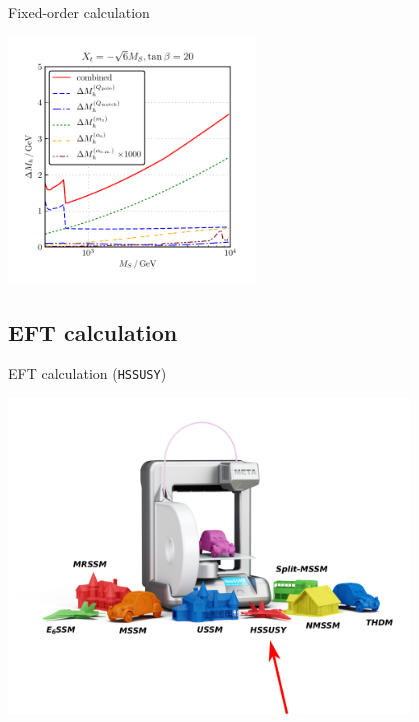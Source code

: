 \documentclass[hyperref={pdfpagelabels=false},ngerman]{beamer}
\begin{document}
\begin{frame}{Fixed-order calculation}
  \begin{center}
    \includegraphics[width=0.49\textwidth]{plots/kuts-9/SS_TB-20_Xt--sqrt6_individual}
  \end{center}
\end{frame}

\subsection{EFT calculation}

\begin{frame}{EFT calculation (\texttt{HSSUSY})}
  \begin{center}
    \includegraphics[width=0.8\textwidth]{images/FS-HSSUSY.png}
  \end{center}
\end{frame}
\end{document}

